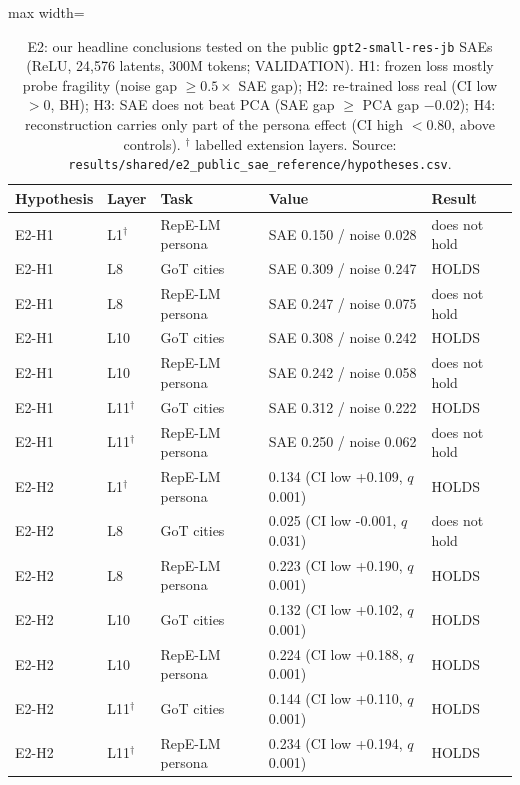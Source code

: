 \begin{table}[t]
\centering
\small
\caption{E2: our headline conclusions tested on the public \texttt{gpt2-small-res-jb} SAEs (ReLU, 24,576 latents, 300M tokens; VALIDATION). H1: frozen loss mostly probe fragility (noise gap $\geq 0.5\times$ SAE gap); H2: re-trained loss real (CI low $>0$, BH); H3: SAE does not beat PCA (SAE gap $\geq$ PCA gap $-0.02$); H4: reconstruction carries only part of the persona effect (CI high $<0.80$, above controls). $^\dagger$ labelled extension layers. Source: \texttt{results/\allowbreak{}shared/\allowbreak{}e2\_public\_sae\_reference/\allowbreak{}hypotheses.csv}.}
\label{tab:e2}
\begin{adjustbox}{max width=\linewidth}
\begin{tabular}{lllll}
\toprule
Hypothesis & Layer & Task & Value & Result \\
\midrule
E2-H1 & L1$^\dagger$ & RepE-LM persona & SAE 0.150 / noise 0.028 & does not hold \\
E2-H1 & L8 & GoT cities & SAE 0.309 / noise 0.247 & HOLDS \\
E2-H1 & L8 & RepE-LM persona & SAE 0.247 / noise 0.075 & does not hold \\
E2-H1 & L10 & GoT cities & SAE 0.308 / noise 0.242 & HOLDS \\
E2-H1 & L10 & RepE-LM persona & SAE 0.242 / noise 0.058 & does not hold \\
E2-H1 & L11$^\dagger$ & GoT cities & SAE 0.312 / noise 0.222 & HOLDS \\
E2-H1 & L11$^\dagger$ & RepE-LM persona & SAE 0.250 / noise 0.062 & does not hold \\
\midrule
E2-H2 & L1$^\dagger$ & RepE-LM persona & 0.134 (CI low +0.109, $q$ 0.001) & HOLDS \\
E2-H2 & L8 & GoT cities & 0.025 (CI low -0.001, $q$ 0.031) & does not hold \\
E2-H2 & L8 & RepE-LM persona & 0.223 (CI low +0.190, $q$ 0.001) & HOLDS \\
E2-H2 & L10 & GoT cities & 0.132 (CI low +0.102, $q$ 0.001) & HOLDS \\
E2-H2 & L10 & RepE-LM persona & 0.224 (CI low +0.188, $q$ 0.001) & HOLDS \\
E2-H2 & L11$^\dagger$ & GoT cities & 0.144 (CI low +0.110, $q$ 0.001) & HOLDS \\
E2-H2 & L11$^\dagger$ & RepE-LM persona & 0.234 (CI low +0.194, $q$ 0.001) & HOLDS \\

\end{tabular}
\end{adjustbox}
\end{table}
